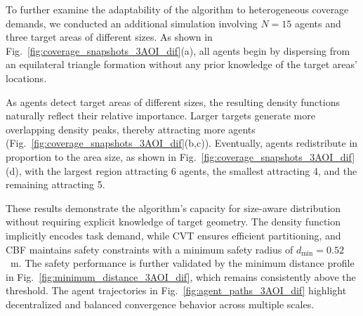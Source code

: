 \documentclass[fleqn,10pt,twocolumn]{main}
\begin{document}
To further examine the adaptability of the algorithm to heterogeneous coverage demands, we conducted an additional simulation involving $N=15$ agents and three target areas of different sizes. As shown in Fig.~\ref{fig:coverage_snapshots_3AOI_dif}(a), all agents begin by dispersing from an equilateral triangle formation without any prior knowledge of the target areas’ locations.

As agents detect target areas of different sizes, the resulting density functions naturally reflect their relative importance. Larger targets generate more overlapping density peaks, thereby attracting more agents (Fig.~\ref{fig:coverage_snapshots_3AOI_dif}(b,c)). Eventually, agents redistribute in proportion to the area size, as shown in Fig.~\ref{fig:coverage_snapshots_3AOI_dif}(d), with the largest region attracting 6 agents, the smallest attracting 4, and the remaining attracting 5.

These results demonstrate the algorithm’s capacity for size-aware distribution without requiring explicit knowledge of target geometry. The density function implicitly encodes task demand, while CVT ensures efficient partitioning, and CBF maintains safety constraints with a minimum safety radius of $d_{\min} = 0.52$~m. The safety performance is further validated by the minimum distance profile in Fig.~\ref{fig:minimum_distance_3AOI_dif}, which remains consistently above the threshold. The agent trajectories in Fig.~\ref{fig:agent_paths_3AOI_dif} highlight decentralized and balanced convergence behavior across multiple scales.


\end{document}
